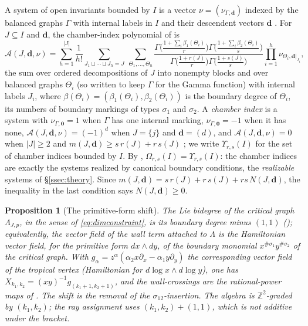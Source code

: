 \documentclass[11pt]{amsart}
\newtheorem{proposition}[theorem]{Proposition}
\theoremstyle{definition}
\theoremstyle{remark}
\newcommand{\ZZ}{\mathbb{Z}}
\newcommand{\Ascr}{\mathcal{A}}
\newcommand{\Om}{\Omega_{r,s}}
\begin{document}
A system of open invariants bounded by $I$ is a vector
$\nu=(\nu_{\Gamma,\mathbf d})$ indexed by the balanced graphs $\Gamma$ with
internal labels in $I$ and their descendent vectors $\mathbf d$
\cite[(0.3)]{GKT}.  For $J\subseteq I$ and $\mathbf d$, the chamber-index
polynomial of \cite[Notation~3.42]{GKT} is
\begin{equation}
\label{eq:Apoly}
\Ascr(J,\mathbf d,\nu)=\sum_{h=1}^{|J|}\frac1{h!}
\sum_{J_1\sqcup\cdots\sqcup J_h=J}\ \sum_{\Theta_1,\dots,\Theta_h}
\frac{\Gamma\bigl(\frac{1+\sum_i \beta_1(\Theta_i)}{r}\bigr)
      \Gamma\bigl(\frac{1+\sum_i \beta_2(\Theta_i)}{s}\bigr)}
     {\Gamma\bigl(\frac{1+r(J)}{r}\bigr)\Gamma\bigl(\frac{1+s(J)}{s}\bigr)}
\prod_{i=1}^h\nu_{\Theta_i,\mathbf d|_{J_i}},
\end{equation}
the sum over ordered decompositions of $J$ into nonempty blocks and over
balanced graphs $\Theta_i$ (so written to keep $\Gamma$ for the Gamma
function) with internal labels $J_i$, where
$\beta(\Theta_i)=(\beta_1(\Theta_i),\beta_2(\Theta_i))$ is the boundary degree of
$\Theta_i$, its numbers of boundary markings of types $\sigma_1$ and $\sigma_2$.  A
\emph{chamber index} is a system with $\nu_{\Gamma,\mathbf 0}=1$ when $\Gamma$
has one internal marking, $\nu_{\Gamma,\mathbf 0}=-1$ when it has none,
$\Ascr(J,\mathbf d,\nu)=(-1)^d$ when $J=\{j\}$ and $\mathbf d=(d)$, and
$\Ascr(J,\mathbf d,\nu)=0$ when $|J|\ge2$ and
$m(J,\mathbf d)\ge s\,r(J)+r\,s(J)$ \cite[Definition~3.47]{GKT}; we write
$\Upsilon_{r,s}(I)$ for the set of chamber indices bounded by $I$.  By
\cite[Corollary~5.14]{GKT}, $\Om(I)=\Upsilon_{r,s}(I)$: the chamber indices are
exactly the systems realized by canonical boundary conditions, the
\emph{realizable} systems of \S\ref{ssec:theory}.
Since $m(J,\mathbf d)=s\,r(J)+r\,s(J)+rs\,N(J,\mathbf d)$, the inequality in
the last condition says $N(J,\mathbf d)\ge0$.

\begin{proposition}[The primitive-form shift]
\label{prop:shift}
The Lie bidegree of the critical graph $\Lambda_{J,p}$, in the sense of
\eqref{eq:dimconstraint}, is its boundary degree minus $(1,1)$
(\cite[Prop.~2.39]{GKT}); equivalently, the vector field of the wall term attached
to $\Lambda$ is the Hamiltonian vector field, for the primitive form $dx\wedge dy$, of the boundary
monomial $x^{\#\sigma_{1}}y^{\#\sigma_{2}}$ of the critical graph. With
$g_{\alpha}=z^{\alpha}(\alpha_{2}x\partial_{x}-\alpha_{1}y\partial_{y})$ the corresponding vector
field of the tropical vertex (Hamiltonian for $d\log x\wedge d\log y$), one has
$X_{k_{1},k_{2}}=(xy)^{-1}g_{(k_{1}+1,k_{2}+1)}$, and the
wall-crossings are the rational-power maps of
\cite[Lem.~4.21]{GKT}. The shift is the removal of the $\sigma_{12}$-insertion.
The algebra is $\ZZ^2$-graded by $(k_1,k_2)$; the ray assignment uses
$(k_1,k_2)+(1,1)$, which is not additive under the bracket.
\end{proposition}
\end{document}
